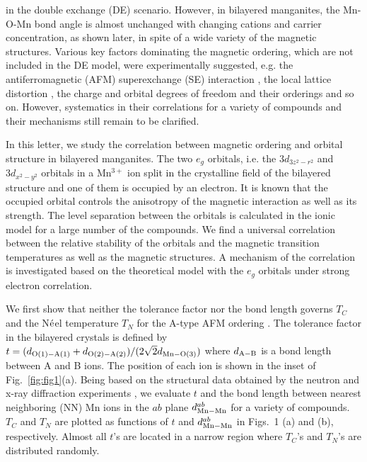 in the double exchange (DE) scenario.
However, in bilayered manganites,
the Mn-O-Mn bond angle is
almost unchanged with changing cations
and carrier concentration, as shown later,
in spite of a wide variety of the magnetic structures.
Various key factors dominating the magnetic ordering, which
are not included in the DE model, were experimentally suggested,
e.g. the antiferromagnetic (AFM) superexchange (SE) interaction \cite{perring},
the local lattice distortion \cite{louca,dessau,medarde,doloc},
the charge and orbital degrees of freedom and their orderings
\cite{moritomo2,kimura} and so on.
However, systematics in their correlations for a variety of compounds
and their mechanisms still remain to be clarified.
\par
In this letter, we study the
correlation between magnetic ordering
and orbital structure in bilayered manganites.
The two $e_g$ orbitals, i.e. the $3d_{3z^2-r^2}$ and $3d_{x^2-y^2}$ orbitals
in a Mn$^{3+}$ ion
split in the crystalline field of the bilayered structure
and one of them is occupied by an electron.
It is known that the occupied orbital controls the anisotropy of the magnetic interaction
as well as its strength.
The level separation between
the orbitals is calculated in the ionic model
for a large number of the compounds.
We find a universal correlation between the relative stability of the orbitals
and the magnetic transition temperatures as well as the magnetic structures.
A mechanism of the correlation is investigated based on the theoretical model
with the $e_g$ orbitals under strong electron correlation.
\par
We first show that
neither the tolerance factor nor the bond length
governs $T_{C}$ and the N$\rm \acute{e}$el temperature $T_N$ for the A-type AFM ordering \cite{aafm}.
The tolerance factor in the bilayered crystals is defined by
$
t=(d_{\rm O(1)-A(1)}+d_{\rm O(2)-A(2)}) / (2\sqrt{2} d_{\rm Mn-O(3)})
$
where $d_{\rm A-B}$ is a bond length between A and B ions.
The position of each ion is shown in the inset of Fig.~\ref{fig:fig1}(a).
Being based on the structural data obtained by the neutron and x-ray diffraction experiments
\cite{kubota,argyriou99,laffez,chi,argyriou97,akimoto,battle98,shen,battle96,seshadri,akimoto2,notice},
we evaluate $t$ and the bond length between nearest neighboring (NN) Mn ions in the $ab$ plane
$d_{\rm Mn-Mn}^{ab}$ for a variety of compounds.
$T_C$ and $T_N$ are plotted as functions of $t$ and
$d_{\rm Mn-Mn}^{ab}$
in Figs.~1 (a) and (b), respectively.
Almost all $t$'s are located in a narrow region
where $T_C$'s and $T_N$'s are distributed randomly.
